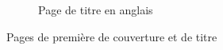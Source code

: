 \begin{landscape}
\begin{figure}[htb]
\begin{subfigure}[b]{.45\linewidth}
      \caption{Page de titre en anglais}
      \label{fig-maketitle-en}
    \end{subfigure}%
    \caption{Pages de première de couverture et de titre}
    \label{fig-maketitle}
  \end{figure}
\end{landscape}
